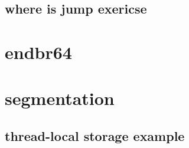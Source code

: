 

\subsection{where is jump exericse}



\section{endbr64}



\section{segmentation}


\subsection{thread-local storage example}


